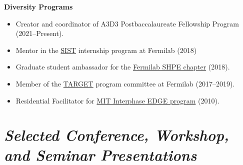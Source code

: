 \documentclass[11pt]{res}
\newcommand{\MarginText}[1]{\section{\textit{#1}}}
\begin{document}
\begin{resume}
  \textbf{Diversity Programs}
  \begin{itemize}
    \itemsep-0.3em
    \item Creator and coordinator of A3D3 Postbaccalaureate Fellowship Program (2021--Present).
    \item Mentor in the \href{http://diversity.fnal.gov/sist/}{SIST} internship program at Fermilab ({2018})
    \item Graduate student ambassador for the \href{http://diversity.fnal.gov/fshpe/}{Fermilab SHPE chapter} ({2018}).
    \item Member of the \href{http://diversity.fnal.gov/target/}{TARGET} program committee at Fermilab ({2017--2019}).
    \item Residential Facilitator for \href{http://ome.mit.edu/programs-services/program-overview}{MIT Interphase EDGE program} ({2010}).
  \end{itemize}


  \MarginText{Selected Conference, Workshop, and Seminar Presentations}


\end{resume}
\end{document}
